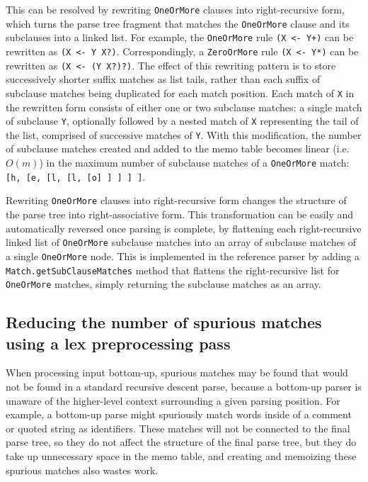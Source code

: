 \documentclass[manuscript,screen]{acmart}
\begin{document}
This can be resolved by rewriting \texttt{OneOrMore} clauses into right-recursive form, which turns the parse tree fragment that matches the \texttt{OneOrMore} clause and its subclauses into a linked list. For example, the \texttt{OneOrMore} rule \texttt{(X <- Y+)} can be rewritten as \texttt{(X <- Y X?)}. Correspondingly, a \texttt{ZeroOrMore} rule \texttt{(X <- Y*)} can be rewritten as \texttt{(X <- (Y X?)?)}. The effect of this rewriting pattern is to store successively shorter suffix matches as list tails, rather than each suffix of subclause matches being duplicated for each match position. Each match of \texttt{X} in the rewritten form consists of either one or two subclause matches: a single match of subclause \texttt{Y}, optionally followed by a nested match of \texttt{X} representing the tail of the list, comprised of successive matches of \texttt{Y}. With this modification, the number of subclause matches created and added to the memo table becomes linear (i.e. $O(m)$) in the maximum number of subclause matches of a \texttt{OneOrMore} match: \texttt{[h, [e, [l, [l, [o] ] ] ] ]}.

Rewriting \texttt{OneOrMore} clauses into right-recursive form changes the structure of the parse tree into right-associative form. This transformation can be easily and automatically reversed once parsing is complete, by flattening each right-recursive linked list of \texttt{OneOrMore} subclause matches into an array of subclause matches of a single \texttt{OneOrMore} node. This is implemented in the reference parser by adding a \texttt{Match.getSubClauseMatches} method that flattens the right-recursive list for \texttt{OneOrMore} matches, simply returning the subclause matches as an array.

\subsection{\label{sec:lex}Reducing the number of spurious matches using a lex preprocessing pass}

When processing input bottom-up, spurious matches may be found that would not be found in a standard recursive descent parse, because a bottom-up parser is unaware of the higher-level context surrounding a given parsing position. For example, a bottom-up parse might spuriously match words inside of a comment or quoted string as identifiers. These matches will not be connected to the final parse tree, so they do not affect the structure of the final parse tree, but they do take up unnecessary space in the memo table, and creating and memoizing these spurious matches also wastes work.
\end{document}
